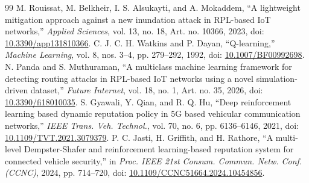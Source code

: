 \documentclass[journal]{IEEEtran}
\begin{document}
\begin{thebibliography}{99}
 M. Rouissat, M. Belkheir, I. S. Alsukayti, and A. Mokaddem, ``A lightweight mitigation approach against a new inundation attack in RPL-based IoT networks,'' \emph{Applied Sciences}, vol. 13, no. 18, Art. no. 10366, 2023, doi: \href{https://doi.org/10.3390/app131810366}{10.3390/app131810366}.
 C. J. C. H. Watkins and P. Dayan, ``Q-learning,'' \emph{Machine Learning}, vol. 8, nos. 3--4, pp. 279--292, 1992, doi: \href{https://doi.org/10.1007/BF00992698}{10.1007/BF00992698}.
 N. Panda and S. Muthuraman, ``A multiclass machine learning framework for detecting routing attacks in RPL-based IoT networks using a novel simulation-driven dataset,'' \emph{Future Internet}, vol. 18, no. 1, Art. no. 35, 2026, doi: \href{https://doi.org/10.3390/fi18010035}{10.3390/fi18010035}.
 S. Gyawali, Y. Qian, and R. Q. Hu, ``Deep reinforcement learning based dynamic reputation policy in 5G based vehicular communication networks,'' \emph{IEEE Trans. Veh. Technol.}, vol. 70, no. 6, pp. 6136--6146, 2021, doi: \href{https://doi.org/10.1109/TVT.2021.3079379}{10.1109/TVT.2021.3079379}.
 P. C. Jasti, H. Griffith, and H. Rathore, ``A multi-level Dempster-Shafer and reinforcement learning-based reputation system for connected vehicle security,'' in \emph{Proc. IEEE 21st Consum. Commun. Netw. Conf. (CCNC)}, 2024, pp. 714--720, doi: \href{https://doi.org/10.1109/CCNC51664.2024.10454856}{10.1109/CCNC51664.2024.10454856}.
\end{thebibliography}
\end{document}
